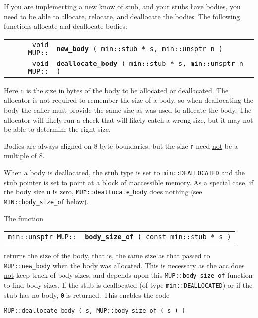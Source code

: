 \documentclass[12pt]{article}
\makeatletter
\newcommand{\ttindex}[1]{\index{#1@{\tt #1}}}
\newcommand{\MUPindex}[1]{\ttindex{MUP::#1}\ttindex{#1}}
\newcommand{\EOL}{\penalty \exhyphenpenalty}
\newenvironment{indpar}[1][0.3in]%
	{\begin{list}{}%
		     {\setlength{\itemsep}{0in}%
		      \setlength{\topsep}{0in}%
		      \setlength{\parsep}{1ex}%
		      \setlength{\labelwidth}{#1}%
		      \setlength{\leftmargin}{#1}%
		      \addtolength{\leftmargin}{\labelsep}}%
	 \item}%
	{\end{list}}
\newcommand{\LABEL}[1]{\label{#1}}
\newcommand{\MUPKEY}[1]{{\tt \bf #1}\MUPindex{#1}}
\makeatother
\begin{document}
If you are implementing a new know of stub, and your stubs have bodies,
you need to be able to allocate, relocate, and deallocate the bodies.
The following functions allocate and deallocate bodies:

\begin{indpar}\begin{tabular}{@{}r@{}l@{}}
\verb|void MUP::|
    & \MUPKEY{new\_body}\verb| ( min::stub * s, min::unsptr n )|
\LABEL{MUP::NEW_BODY} \\
\verb|void MUP::|
    & \MUPKEY{deallocate\_body}\verb| ( min::stub * s, min::unsptr n )|
\LABEL{MUP::DEALLOCATE_BODY} \\
\end{tabular}\end{indpar}

Here \verb|n| is the size in bytes of the body to be allocated or deallocated.
The allocator is not required to remember the size of a body,
so when deallocating the body the caller must provide the same size
as was used to allocate the body.  The allocator will likely
run a check that will likely catch a wrong size, but it may not
be able to determine the right size.

Bodies are always aligned on 8 byte boundaries, but the size \verb|n|
need \underline{not} be a multiple of 8.

When a body is deallocated, the stub type is set to
\verb|min::DEALLOCATED| and the stub pointer is set to
point at a block of inaccessible memory.
As a special case, if the body size \verb|n| is zero,
{\tt MUP::\EOL deallocate\_\EOL body} does nothing
(see {\tt MIN::\EOL body\_\EOL size\_\EOL of} below).


The function

\begin{indpar}\begin{tabular}{@{}r@{}l@{}}
\verb|min::unsptr MUP::|
    & \MUPKEY{body\_size\_of}\verb| ( const min::stub * s )|
\LABEL{MUP::BODY_SIZE_OF} \\
\end{tabular}\end{indpar}

returns the size of the body, that is, the same size
as that passed to {\tt MUP::new\_\EOL body} when the
body was allocated.  This is necessary as the acc does
\underline{not} keep track of body sizes, and depends upon
this {\tt MUP::body\_\EOL size\_\EOL of} function to
find body sizes.  If the stub is deallocated (of type
\verb|min::DEALLOCATED|) or if the stub has no body,
\verb|0| is returned.  This enables the code
\begin{center}
\verb|MUP::deallocate_body ( s, MUP::body_size_of ( s ) )|
\end{center}
\end{document}
